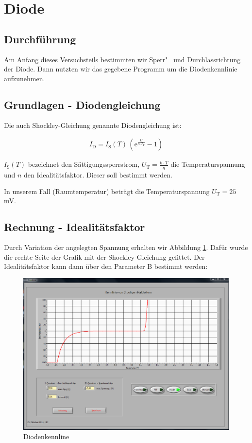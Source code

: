 \section{Diode}
\subsection*{Durchführung}
Am Anfang dieses Versuchsteils bestimmten wir Sperr"~ und Durchlassrichtung der Diode. Dann nutzten wir das gegebene Programm um die Diodenkennlinie aufzunehmen.

\subsection{Grundlagen - Diodengleichung}

Die auch Shockley-Gleichung genannte Diodengleichung ist: 

\begin{eqnarray}
\label{eq:shockley}
I_\text{D} = I_\text{S}(T) \, \left(\mathrm e^\frac{U}{n\,U_\text{T}} - 1 \right)
\end{eqnarray}

$I_\text{S}(T)$ bezeichnet den Sättigungssperrstrom, $ U_\text{T}= \frac{k \cdot T} q$ die Tem\-pe\-ra\-tur\-span\-nung und $n$ den Idealitätsfaktor. Dieser soll bestimmt werden. 

In unserem Fall (Raumtemperatur) beträgt die Temperaturspannung  ${U_\text{T}=25}$\,mV.

\subsection*{Rechnung - Idealitätsfaktor}

Durch Variation der angelegten Spannung erhalten wir Abbildung \ref{fig:diode}. Dafür wurde die rechte Seite der Grafik mit der Shockley-Gleichung gefittet. Der Idealitätsfaktor kann dann über den Parameter B bestimmt werden:

\begin{figure}[t]
    \centering
    \includegraphics[width=\linewidth]{data/Diode.png}
    \caption{Diodenkennline}
    \label{fig:diode}
\end{figure}

